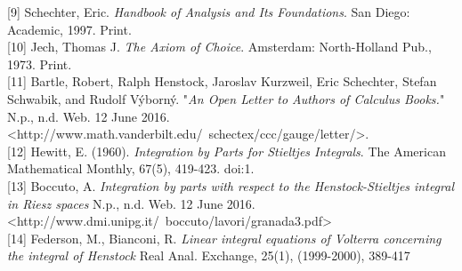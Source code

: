 \documentclass[12pt, a4paper]{article}
\theoremstyle{definition}
\begin{document}
[9] Schechter, Eric. \textit{Handbook of Analysis and Its Foundations}. San Diego: Academic, 1997. Print. \\

[10] Jech, Thomas J.\textit{ The Axiom of Choice}. Amsterdam: North-Holland Pub., 1973. Print. \\

[11] Bartle, Robert, Ralph Henstock, Jaroslav Kurzweil, Eric Schechter, Stefan Schwabik, and Rudolf Výborný. "\textit{An Open Letter to Authors of Calculus Books.}" N.p., n.d. Web. 12 June 2016. <http://www.math.vanderbilt.edu/~schectex/ccc/gauge/letter/>. \\

[12] Hewitt, E. (1960).\textit{ Integration by Parts for Stieltjes Integrals}. The American Mathematical Monthly, 67(5), 419-423. doi:1. \\

[13] Boccuto, A. \textit{Integration by parts with respect to the Henstock-Stieltjes integral in Riesz spaces}  N.p., n.d. Web. 12 June 2016. <http://www.dmi.unipg.it/~boccuto/lavori/granada3.pdf>  \\

[14]  Federson, M., Bianconi, R. \textit{Linear integral equations of Volterra concerning the integral of Henstock}
Real Anal. Exchange, 25(1), (1999-2000), 389-417
\end{document}
